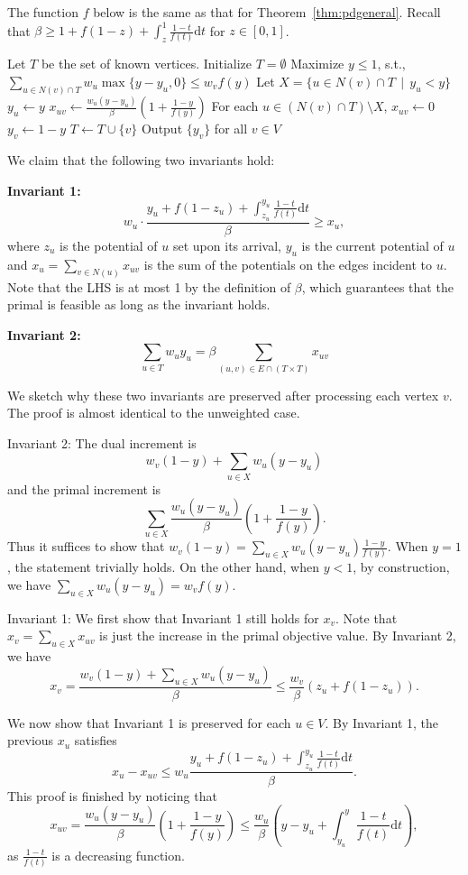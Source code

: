 \documentclass{article}
\begin{document}
The function $f$ below is the same as that for Theorem~\ref{thm:pdgeneral}. Recall that $\beta\geq 1+f(1-z)+\int_z^1 \frac{1-t}{f(t)}\mathrm{d}t$ for $z\in [0,1]$.

\begin{algorithm}[h!]
\SetAlgoLined
\caption{$PrimalDual-Weighted$}
\label{alg:general greedy weighted}
Let $T$ be the set of known vertices. Initialize $T=\emptyset$\;
{
Maximize $y\le 1$, s.t., $\sum_{u\in N(v)\cap T} w_u\max\{y-y_u,0\} \leq w_vf(y)$\;
Let $X = \{u \in N(v)\cap T \,\mid\, y_u < y\}$\;
{
$y_u\leftarrow y$\;
$x_{uv}\longleftarrow \frac{w_u(y-y_u)}{\beta}\left(1+\frac{1-y}{f(y)}\right)$\;
}
For each $u \in (N(v)\cap T)\setminus X$, $x_{uv}\longleftarrow 0$\;
$y_v \leftarrow 1-y$\;
$T\leftarrow T\cup \{v\}$\;
}
Output $\{y_v\}$ for all $v\in V$\;
\end{algorithm}

We claim that the following two invariants hold:

\textbf{Invariant 1:} $$w_u\cdot\frac{y_{u}+f(1-z_u)+\int_{z_u}^{y_{u}}\frac{1-t}{f(t)}\mathrm{d}t}{\beta}\geq x_{u},$$ where $z_u$ is the potential of $u$ set upon its arrival, $y_u$ is the current potential of $u$ and $x_u = \sum_{v \in N(u)} x_{uv}$ is the sum of the potentials on the edges incident to $u$. Note that the LHS is at most 1  by the definition of $\beta$, which guarantees that the primal is feasible as long as the invariant holds.

\textbf{Invariant 2:} $$\sum_{u\in T} w_uy_{u}=\beta\sum_{(u,v)\in E\cap (T\times T)} x_{uv}$$

We sketch why these two invariants are preserved after processing each vertex $v$. The proof is almost identical to the unweighted case.

Invariant 2: The dual increment is $$w_v(1-y)+\sum_{u\in X}w_u(y-y_u)$$ and the primal increment is $$\sum_{u\in X} \frac{w_u(y-y_u)}{\beta}\left( 1 + \frac{1-y}{f(y)}\right).$$
Thus it suffices to show that $w_v(1-y)=\sum_{u\in X}w_u(y-y_u)\frac{1-y}{f(y)}$. 
When $y=1$, the statement trivially holds. On the other hand, when $y<1$, by construction, we have
$\sum_{u\in X}w_u(y-y_u)=w_vf(y)$.

Invariant 1: We first show that Invariant 1 still holds for $x_v$. Note that $x_v=\sum_{u\in X}x_{uv}$ is just the increase in the primal objective value. By Invariant 2, we have
$$x_v=\frac{w_v(1-y)+\sum_{u\in X}w_u(y-y_u)}{\beta}\le \frac{w_v}{\beta}(z_u + f(1-z_u)).$$

We now show that Invariant 1 is preserved for each $u\in V$. By Invariant 1, the previous $x_u$ satisfies $$x_u-x_{uv}\leq w_u\frac{y_{u}+f(1-z_u)+\int_{z_u}^{y_{u}}\frac{1-t}{f(t)}\mathrm{d}t}{\beta}.$$
This proof is finished by noticing that $$x_{uv}=\frac{w_u(y-y_u)}{\beta}\left( 1 + \frac{1-y}{f(y)}\right)\leq  \frac{w_u}{\beta} \left( y-y_u+ \int_{y_u}^y \frac{1-t}{f(t)}
\mathrm{d}t\right),$$ as $\frac{1-t}{f(t)}$ is a decreasing function.








\clearpage{}
\end{document}

